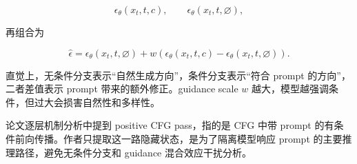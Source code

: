 \begin{equation}
    \epsilon_\theta(x_t,t,c), \qquad
    \epsilon_\theta(x_t,t,\varnothing),
\end{equation}

再组合为

\begin{equation}
    \hat{\epsilon}
    = \epsilon_\theta(x_t,t,\varnothing)
    + w\left(\epsilon_\theta(x_t,t,c)-\epsilon_\theta(x_t,t,\varnothing)\right).
\end{equation}

直觉上，无条件分支表示“自然生成方向”，条件分支表示“符合 prompt 的方向”，二者差值表示 prompt 带来的额外修正。guidance scale $w$ 越大，模型越强调条件，但过大会损害自然性和多样性。

论文逐层机制分析中提到 positive CFG pass，指的是 CFG 中带 prompt 的有条件前向传播。作者只提取这一路隐藏状态，是为了隔离模型响应 prompt 的主要推理路径，避免无条件分支和 guidance 混合效应干扰分析。
